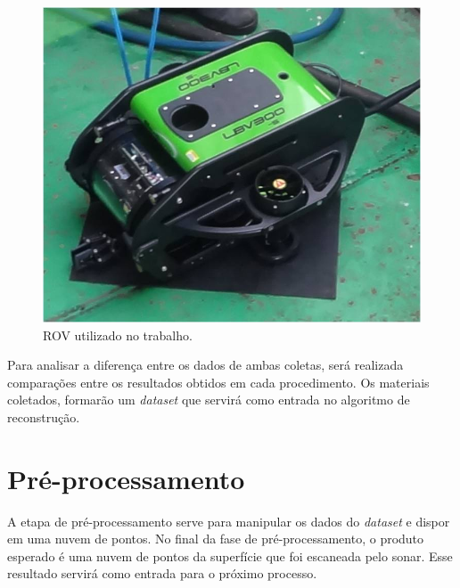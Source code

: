 \begin{figure}[H]
    \centering
    \caption{ROV utilizado no trabalho.}
    \label{fig:rov_nautec}
    \includegraphics[scale=0.5]{dados/figuras/rov_furg.jpg}
\end{figure}

Para analisar a diferença entre os dados de ambas coletas, será realizada comparações entre os resultados obtidos em cada procedimento. Os materiais coletados, formarão um \textit{dataset} que servirá como entrada no algoritmo de reconstrução.

\section{Pré-processamento}

A etapa de pré-processamento serve para manipular os dados do \textit{dataset} e dispor em uma nuvem de pontos.
No final da fase de pré-processamento, o produto esperado é uma nuvem de pontos da superfície que foi escaneada pelo sonar. Esse resultado servirá como entrada para o próximo processo.

